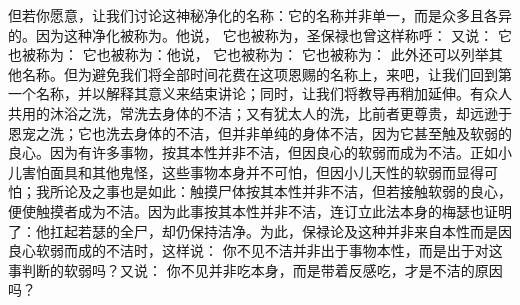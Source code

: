 但若你愿意，让我们讨论这神秘净化的名称：它的名称并非单一，而是众多且各异的。因为这种净化被称为。他说，  它也被称为，圣保禄也曾这样称呼：  又说：  它也被称为：  它也被称为：他说，  它也被称为：  它也被称为：  此外还可以列举其他名称。但为避免我们将全部时间花费在这项恩赐的名称上，来吧，让我们回到第一个名称，并以解释其意义来结束讲论；同时，让我们将教导再稍加延伸。有众人共用的沐浴之洗，常洗去身体的不洁；又有犹太人的洗，比前者更尊贵，却远逊于恩宠之洗；它也洗去身体的不洁，但并非单纯的身体不洁，因为它甚至触及软弱的良心。因为有许多事物，按其本性并非不洁，但因良心的软弱而成为不洁。正如小儿害怕面具和其他鬼怪，这些事物本身并不可怕，但因小儿天性的软弱而显得可怕；我所论及之事也是如此：触摸尸体按其本性并非不洁，但若接触软弱的良心，便使触摸者成为不洁。因为此事按其本性并非不洁，连订立此法本身的梅瑟也证明了：他扛起若瑟的全尸，却仍保持洁净。为此，保禄论及这种并非来自本性而是因良心软弱而成的不洁时，这样说：  你不见不洁并非出于事物本性，而是出于对这事判断的软弱吗？又说：  你不见并非吃本身，而是带着反感吃，才是不洁的原因吗？\par

